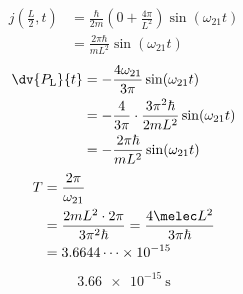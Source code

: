 \begin{align*}
j\left(\frac{L}{2},t\right)&=\frac{\hbar}{2m}\left(0+\frac{4\pi}{L^{2}}\right)\sin(\omega_{21}t)\\
&=\frac{2\pi\hbar}{mL^{2}}\sin(\omega_{21}t)
\end{align*}
\begin{align*}
\dv{P_{\mathrm{L}}}{t}&=-\frac{4\omega_{21}}{3\pi}\sin(\omega_{21}t)\\
&=-\frac{4}{3\pi}\cdot\frac{3\pi^{2}\hbar}{2mL^{2}}\sin(\omega_{21}t)\\
&=-\frac{2\pi\hbar}{mL^{2}}\sin(\omega_{21}t)
\end{align*}
\begin{align*}
T&=\frac{2\pi}{\omega_{21}}\\
&=\frac{2mL^{2}\cdot2\pi}{3\pi^{2}\hbar}=\frac{4\melec L^{2}}{3\pi\hbar}\\
&=3.6644\cdots\times10^{-15}
\end{align*}
\[ \qty{3.66e-15}{\second} \]
